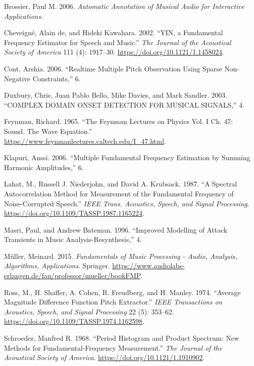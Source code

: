 \documentclass[american,]{article}
\begin{document}
\leavevmode\hypertarget{ref-brossier}{}%
Brossier, Paul M. 2006. \emph{Automatic Annotation of Musical Audio for Interactive Applications}.

\leavevmode\hypertarget{ref-yin_2002}{}%
Cheveigné, Alain de, and Hideki Kawahara. 2002. ``YIN, a Fundamental Frequency Estimator for Speech and Music.'' \emph{The Journal of the Acoustical Society of America} 111 (4): 1917--30. \url{https://doi.org/10.1121/1.1458024}.

\leavevmode\hypertarget{ref-cont_2006}{}%
Cont, Arshia. 2006. ``Realtime Multiple Pitch Observation Using Sparse Non-Negative Constraints,'' 6.

\leavevmode\hypertarget{ref-duxbury}{}%
Duxbury, Chris, Juan Pablo Bello, Mike Davies, and Mark Sandler. 2003. ``COMPLEX DOMAIN ONSET DETECTION FOR MUSICAL SIGNALS,'' 4.

\leavevmode\hypertarget{ref-feynman}{}%
Feynman, Richard. 1965. ``The Feynman Lectures on Physics Vol. I Ch. 47: Sound. The Wave Equation.'' \url{https://www.feynmanlectures.caltech.edu/I_47.html}.

\leavevmode\hypertarget{ref-klapuri}{}%
Klapuri, Anssi. 2006. ``Multiple Fundamental Frequency Estimation by Summing Harmonic Amplitudes,'' 6.

\leavevmode\hypertarget{ref-lahat_spectral_1987}{}%
Lahat, M., Russell J. Niederjohn, and David A. Krubsack. 1987. ``A Spectral Autocorrelation Method for Measurement of the Fundamental Frequency of Noise-Corrupted Speech.'' \emph{IEEE Trans. Acoustics, Speech, and Signal Processing}. \url{https://doi.org/10.1109/TASSP.1987.1165224}.

\leavevmode\hypertarget{ref-hfc}{}%
Masri, Paul, and Andrew Bateman. 1996. ``Improved Modelling of Attack Transients in Music Analysis-Resynthesis,'' 4.

\leavevmode\hypertarget{ref-muller_2015}{}%
Müller, Meinard. 2015. \emph{Fundamentals of Music Processing - Audio, Analysis, Algorithms, Applications}. Springer. \url{https://www.audiolabs-erlangen.de/fau/professor/mueller/bookFMP}.

\leavevmode\hypertarget{ref-ross_average_1974}{}%
Ross, M., H. Shaffer, A. Cohen, R. Freudberg, and H. Manley. 1974. ``Average Magnitude Difference Function Pitch Extractor.'' \emph{IEEE Transactions on Acoustics, Speech, and Signal Processing} 22 (5): 353--62. \url{https://doi.org/10.1109/TASSP.1974.1162598}.

\leavevmode\hypertarget{ref-schroeder_period_1968}{}%
Schroeder, Manfred R. 1968. ``Period Histogram and Product Spectrum: New Methods for Fundamental-Frequency Measurement.'' \emph{The Journal of the Acoustical Society of America}. \url{https://doi.org/10.1121/1.1910902}.
\end{document}
